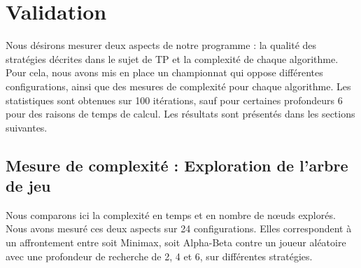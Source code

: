 \chapter{Validation}
\label{ch:validation}
Nous désirons mesurer deux aspects de notre programme : la qualité des stratégies décrites dans le sujet de \ac{TP} et la complexité de chaque algorithme. Pour cela, nous avons mis en place un championnat qui oppose différentes configurations, ainsi que des mesures de complexité pour chaque algorithme. Les statistiques sont obtenues sur 100 itérations, sauf pour certaines profondeurs 6 pour des raisons de temps de calcul. Les résultats sont présentés dans les sections suivantes.


\section{Mesure de complexité : Exploration de l'arbre de jeu}
\label{sec:game_tree_exploration}
Nous comparons ici la complexité en temps et en nombre de nœuds explorés. Nous avons mesuré ces deux aspects sur 24 configurations. Elles correspondent à un affrontement entre soit Minimax, soit Alpha-Beta contre un joueur aléatoire avec une profondeur de recherche de 2, 4 et 6, sur différentes stratégies.



